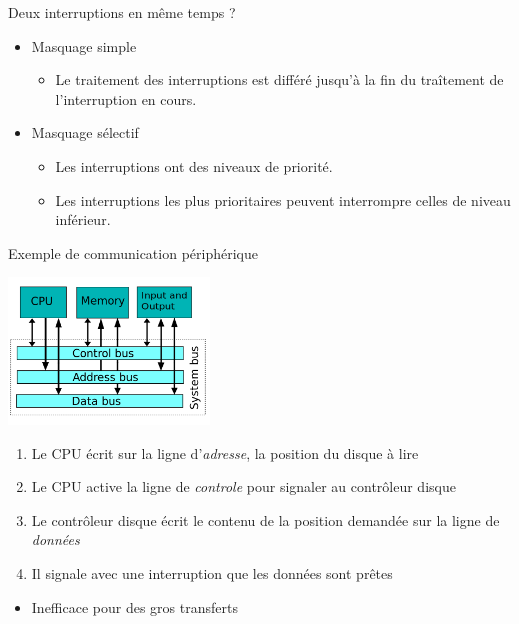 \documentclass[11pt]{beamer}
\begin{document}
\begin{frame}{Deux interruptions en même temps ?}

\begin{itemize}
\itemsep1pt\parskip0pt
\item
  Masquage simple

  \begin{itemize}
  \itemsep1pt\parskip0pt
  \item
    Le traitement des interruptions est différé jusqu'à la fin du
    traîtement de l'interruption en cours.
  \end{itemize}
\item
  Masquage sélectif

  \begin{itemize}
  \itemsep1pt\parskip0pt
  \item
    Les interruptions ont des niveaux de priorité.
  \item
    Les interruptions les plus prioritaires peuvent interrompre celles
    de niveau inférieur.
  \end{itemize}
\end{itemize}

\end{frame}

\begin{frame}{Exemple de communication périphérique}

\includegraphics[width=0.4\textwidth]{figs/bus.png}

\begin{enumerate}
\def\labelenumi{\arabic{enumi}.}
\itemsep1pt\parskip0pt
\item
  Le CPU écrit sur la ligne d'\emph{adresse}, la position du disque à
  lire
\item
  Le CPU active la ligne de \emph{controle} pour signaler au contrôleur
  disque
\item
  Le contrôleur disque écrit le contenu de la position demandée sur la
  ligne de \emph{données}
\item
  Il signale avec une interruption que les données sont prêtes
\end{enumerate}

\begin{itemize}
\itemsep1pt\parskip0pt
\item
  Inefficace pour des gros transferts
\end{itemize}

\end{frame}
\end{document}
